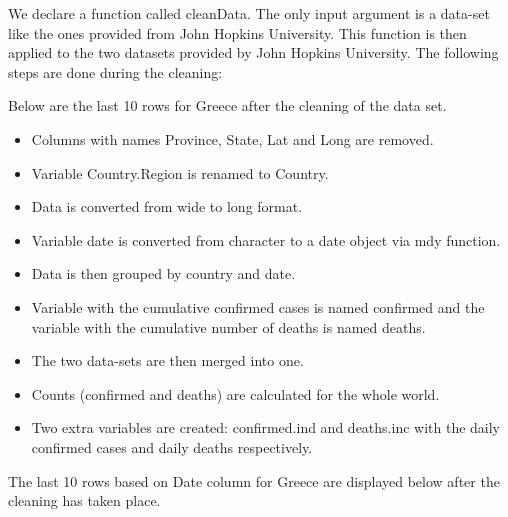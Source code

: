 We declare a function called cleanData. The only input argument is a data-set like the ones provided from John Hopkins University. This function is then applied to the two datasets provided by John Hopkins University. The following steps are done during the cleaning:

Below are the last 10 rows for Greece after the cleaning of the data set.

\begin{itemize}
	\item Columns with names Province, State, Lat and Long are removed.
	\item Variable Country.Region is renamed to Country.
	\item Data is converted from wide to long format.
	\item Variable date is converted from character to a date object via mdy function.
	\item Data is then grouped by country and date.
	\item Variable with the cumulative confirmed cases is named confirmed and
the variable with the cumulative number of deaths is named deaths.
	\item The two data-sets are then merged into one.
	\item Counts (confirmed and deaths) are calculated for the whole world.
	\item Two extra variables are created: confirmed.ind and deaths.inc with the
daily confirmed cases and daily deaths respectively.
\end{itemize}
\hspace{}
\newline
The last 10 rows based on Date column for Greece are displayed below after the cleaning has taken place.
\newline
